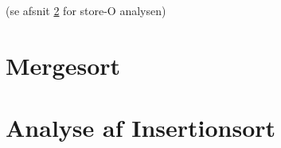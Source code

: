 (se afsnit \ref{sec:Analyse af Insertionsort} for store-O analysen)

\section{Mergesort}
\label{sec:Mergesort}

%

\section{Analyse af Insertionsort}
\label{sec:Analyse af Insertionsort}


